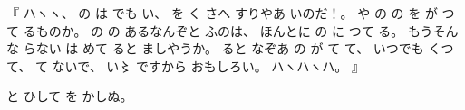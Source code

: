 %
『
ハヽヽ、
%
の
は
でも
い、
%
を
く
さへ
すりやあ
いのだ！。
%
や%
の%
の
を
が
つて
るものか。
%
の
の
あるなんぞと
ふのは、
%
ほんとに
の
に
つて
る。
%
もうそんな
らない
は
めて
ると
ましやうか。
%
ると
なぞあ
の
が
て
て、
%
いつでも
くつて、
%
て
ないで、
%
い〻%
ですから
おもしろい。
%
ハヽハヽハ。
』

%
と
ひして
を
かしぬ。
